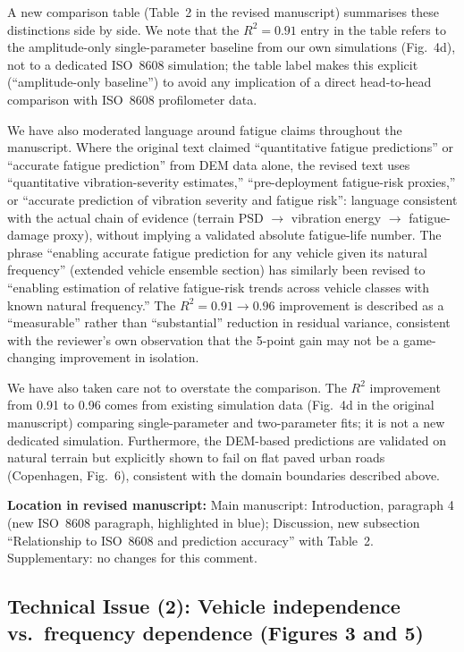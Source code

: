 \documentclass[11pt]{article}
\newcommand{\revloc}[1]{\noindent\textbf{Location in revised manuscript:} #1\medskip}
\begin{document}
\noindent A new comparison table (Table~2 in the revised manuscript) summarises these distinctions side by side. We note that the $R^2 = 0.91$ entry in the table refers to the amplitude-only single-parameter baseline from our own simulations (Fig.~4d), not to a dedicated ISO~8608 simulation; the table label makes this explicit (``amplitude-only baseline'') to avoid any implication of a direct head-to-head comparison with ISO~8608 profilometer data.

We have also moderated language around fatigue claims throughout the manuscript. Where the original text claimed ``quantitative fatigue predictions'' or ``accurate fatigue prediction'' from DEM data alone, the revised text uses ``quantitative vibration-severity estimates,'' ``pre-deployment fatigue-risk proxies,'' or ``accurate prediction of vibration severity and fatigue risk'': language consistent with the actual chain of evidence (terrain PSD $\rightarrow$ vibration energy $\rightarrow$ fatigue-damage proxy), without implying a validated absolute fatigue-life number. The phrase ``enabling accurate fatigue prediction for any vehicle given its natural frequency'' (extended vehicle ensemble section) has similarly been revised to ``enabling estimation of relative fatigue-risk trends across vehicle classes with known natural frequency.'' The $R^2 = 0.91 \rightarrow 0.96$ improvement is described as a ``measurable'' rather than ``substantial'' reduction in residual variance, consistent with the reviewer's own observation that the 5-point gain may not be a game-changing improvement in isolation.

We have also taken care not to overstate the comparison. The $R^2$ improvement from 0.91 to 0.96 comes from existing simulation data (Fig.\ 4d in the original manuscript) comparing single-parameter and two-parameter fits; it is not a new dedicated simulation. Furthermore, the DEM-based predictions are validated on natural terrain but explicitly shown to fail on flat paved urban roads (Copenhagen, Fig.\ 6), consistent with the domain boundaries described above.

\revloc{Main manuscript: Introduction, paragraph 4 (new ISO~8608 paragraph, highlighted in blue); Discussion, new subsection ``Relationship to ISO~8608 and prediction accuracy'' with Table~2. Supplementary: no changes for this comment.}

\bigskip

\subsection*{Technical Issue (2): Vehicle independence vs.\ frequency dependence (Figures 3 and 5)}
\end{document}
